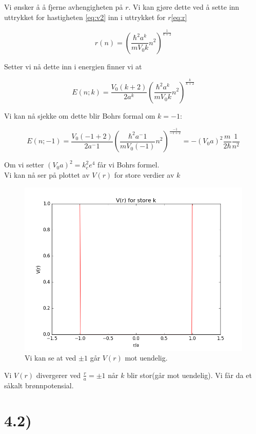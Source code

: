 \documentclass[a4paper,norsk, 10pt]{article}
\begin{document}
Vi ønsker å å fjerne avhengigheten på $r$. Vi kan gjøre dette ved å sette inn uttrykket for hastigheten \ref{eq:v2} inn i uttrykket for $r$\ref{eq:r}

$$
r(n) = \left(\frac{\hbar^2 a^k}{mV_0k}n^2\right)^{\frac{1}{k+2}}
$$

Setter vi nå dette inn i energien finner vi at 

\begin{equation}
E(n;k) = \frac{V_0(k+2)}{2a^k}\left(\frac{\hbar^2 a^k}{mV_0k}n^2\right)^{\frac{k}{k+2}}
\end{equation}

Vi kan nå sjekke om dette blir Bohrs formal om $k = -1$:

$$
E(n;-1) = \frac{V_0(-1+2)}{2a^-1}\left(\frac{\hbar^2 a^-1}{mV_0(-1)}n^2\right)^{\frac{-1}{-1+2}} = -(V_0a)^2\frac{m}{2\hbar}\frac{1}{n^2}
$$

Om vi setter $(V_0a)^2 = k_e^2e^4$ får vi Bohrs formel.\\

Vi kan nå ser på plottet av $V(r)$ for store verdier av $k$

\begin{figure}[H]
\centering
\includegraphics[scale=0.3]{vr.png}
\caption{Vi kan se at ved $\pm 1$ går $V(r)$ mot uendelig.}
\end{figure}

Vi $V(r)$ divergerer ved $ \frac{r}{a} = \pm 1$ når $k$ blir stor(går mot uendelig). Vi får da et såkalt brønnpotensial.

\section*{4.2)}
\end{document}
